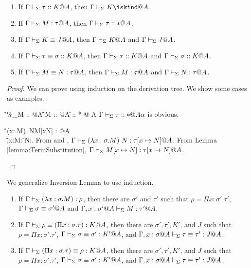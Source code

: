 \begin{lemma}[Agreement]
    \label{lemma:Agreement}
    \begin{enumerate}
        \item If \(\Gamma\vdash_\Sigma \tau::K@A\), then \(\G\V K\iskind@A \).
        \item If \(\G\V M:\tau@A\), then \(\Gamma\vdash_\Sigma \tau::*@A\).
        \item If \(\Gamma\vdash_\Sigma K\equiv J@A\), then \(\Gamma\vdash_\Sigma K @A\) and \(\Gamma\vdash_\Sigma J @A\).
        \item If \(\Gamma\vdash_\Sigma \tau\equiv \sigma :: K@A\), then \(\Gamma\vdash_\Sigma \tau::K@A\) and \(\Gamma\vdash_\Sigma \sigma::K@A\).
        \item If \(\G\V M\E N : \tau@A\), then \(\G\V M:\tau@A\) and \(\G\V N:\tau@A\).
    \end{enumerate}
\end{lemma}
\begin{proof}

    We can prove using induction on the derivation tree.
    We show some cases as examples.

    \begin{rneqncase}{\TCsp{}}{
            \G\V \%_\alpha M :: \tau @A\alpha {} \G\V M :: \tau @A  \G \V \tau :: * @ A\alpha
            }
            \( \Gamma \vdash_\Sigma \tau :: * @ A\alpha \) is obvious.
    \end{rneqncase}
    \begin{rneqncase}{\QBeta{}}{
            \G\V(\lambda x:\sigma.M)\ N\E M[x\mapsto N] : \tau[x \mapsto N]@A \\
            \G,x:\sigma@A\V M:\tau@A {} \G\V N:\sigma@A.
            }
            From \TAbs{} and \TApp, \( \Gamma\vdash_\Sigma(\lambda x:\sigma.M)\ N : \tau[x \mapsto N]@A \).
            From Lemma \ref{lemma:TermSubstitution}, \( \Gamma\vdash_\Sigma M[x\mapsto N] : \tau[x \mapsto N]@A \).
    \end{rneqncase}

\end{proof}

We generalize Inversion Lemma to use induction.
\begin{lemma}
    \label{lemma:InversionLemmaForPiType}
    \begin{enumerate}
        \item If $\Gamma \vdash_\Sigma (\lambda x:\sigma.M) : \rho$, then there are $\sigma'$ and $\tau'$ such that
            $\rho = \Pi x:\sigma'.\tau'$, $\Gamma \vdash_\Sigma \sigma \equiv \sigma'@A$ and $\Gamma ,x:\sigma'@A\vdash_\Sigma M:\tau'@A$.
        \item If $\Gamma \vdash_\Sigma \rho \equiv (\Pi x:\sigma.\tau) : K @A$, then there are $\sigma', \tau', K'$, and $J$ such that
            $\rho = \Pi x:\sigma'.\tau'$, $\Gamma \vdash_\Sigma \sigma \equiv \sigma' : K' @A$, and $\G, x:\sigma@A\V \tau \E \tau' : J @A$.
        \item If $\Gamma \vdash_\Sigma (\Pi x:\sigma.\tau) \equiv \rho : K @A$, then there are $\sigma', \tau', K'$, and $J$ such that
            $\rho = \Pi x:\sigma'.\tau'$, $\Gamma \vdash_\Sigma \sigma \equiv \sigma' : K' @A$, and $\G, x:\sigma@A\V \tau \E \tau' : J @A$.
    \end{enumerate}
\end{lemma}

